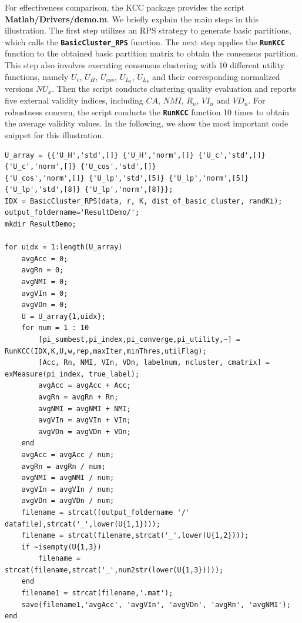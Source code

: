 \documentclass[10pt]{acmtrans2e}
\newcommand{\package}[1]{\textsf{#1}\xspace} %
\newcommand{\function}[1]{\textbf{\texttt{#1}}}
\begin{document}
For effectiveness comparison, the \package{KCC} package provides the script \textbf{Matlab/Drivers/demo.m}. We briefly explain the main steps in this illustration. The first step utilizes an RPS strategy to generate basic partitions, which calls the \function{BasicCluster\_RPS} function. The next step applies the \function{RunKCC} function to the obtained basic partition matrix to obtain the consensus partition. This step also involves executing consensus clustering with 10 different utility functions, namely $U_c$, $U_H$, $U_{cos}$, $U_{L_5}$, $U_{L_8}$ and their corresponding normalized versions $NU_x$. Then the script conducts clustering quality evaluation and reports five external validity indices, including $CA$, $NMI$, $R_n$, $VI_n$ and $VD_n$. For robustness concern, the script conducts the \function{RunKCC} function 10 times to obtain the average validity values. In the following, we show the most important code snippet for this illustration.
\begin{lstlisting}[caption={Using \function{demo.m} to evaluate the clustering quality of \package{KCC} with different utility functions.},label=lst:evaqualityutility]
U_array = {{'U_H','std',[]} {'U_H','norm',[]} {'U_c','std',[]} {'U_c','norm',[]} {'U_cos','std',[]} 
{'U_cos','norm',[]} {'U_lp','std',[5]} {'U_lp','norm',[5]} {'U_lp','std',[8]} {'U_lp','norm',[8]}};
IDX = BasicCluster_RPS(data, r, K, dist_of_basic_cluster, randKi);
output_foldername='ResultDemo/';
mkdir ResultDemo;

for uidx = 1:length(U_array)
    avgAcc = 0;
    avgRn = 0;
    avgNMI = 0;
    avgVIn = 0;
    avgVDn = 0;
    U = U_array{1,uidx};
    for num = 1 : 10
        [pi_sumbest,pi_index,pi_converge,pi_utility,~] = RunKCC(IDX,K,U,w,rep,maxIter,minThres,utilFlag);
        [Acc, Rn, NMI, VIn, VDn, labelnum, ncluster, cmatrix] = exMeasure(pi_index, true_label);
        avgAcc = avgAcc + Acc;
        avgRn = avgRn + Rn;
        avgNMI = avgNMI + NMI;
        avgVIn = avgVIn + VIn;
        avgVDn = avgVDn + VDn;
    end
    avgAcc = avgAcc / num;
    avgRn = avgRn / num;
    avgNMI = avgNMI / num;
    avgVIn = avgVIn / num;
    avgVDn = avgVDn / num;
    filename = strcat([output_foldername '/' datafile],strcat('_',lower(U{1,1})));
    filename = strcat(filename,strcat('_',lower(U{1,2})));
    if ~isempty(U{1,3})
        filename = strcat(filename,strcat('_',num2str(lower(U{1,3}))));
    end
    filename1 = strcat(filename,'.mat');
    save(filename1,'avgAcc', 'avgVIn', 'avgVDn', 'avgRn', 'avgNMI');
end
\end{lstlisting}
\end{document}
